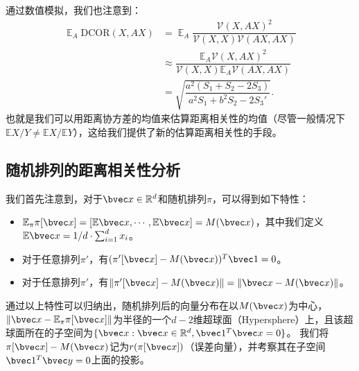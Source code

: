通过数值模拟，我们也注意到：
\begin{equation}
\label{eq:ss-perm:linear-dcor-estimation}
\begin{split}
    \mathop{\mathbb E}_A \text{DCOR}(X, AX) & = \mathop{\mathbb E}_A \dfrac{\mathcal{V}(X, AX)^2}{\mathcal{V}(X, X)\mathcal{V}(AX, AX)}
    \\
    &\approx \dfrac{\mathbb E_A \mathcal{V}(X, AX)^2}{\mathcal{V}(X, X) \mathbb E_A \mathcal{V}(AX, AX)}
    \\
    &= \sqrt{\dfrac{a^2(S_1 + S_2 - 2S_3)}{a^2S_1 + b^2S_2 - 2S_3'}}.
\end{split}
\end{equation}
%
也就是我们可以用距离协方差的均值来估算距离相关性的均值（尽管一般情况下$\mathbb E X/Y \ne \mathbb E X/\mathbb E Y$），这给我们提供了新的估算距离相关性的手段。
%


\subsection{随机排列的距离相关性分析}
我们首先注意到，对于$\bvec x \in \mathbb R^d$和随机排列$\pi$，可以得到如下特性：
\begin{itemize}
    \item $\mathbb E_\pi \pi[\bvec x] = [\mathbb E\bvec x, \cdots, \mathbb E\bvec x] = M(\bvec x)$，其中我们定义$\mathbb E\bvec x = 1/d \cdot \sum_{i=1}^d x_i$。
    \item 对于任意排列$\pi'$，有$(\pi'[\bvec x] - M(\bvec x))^T \bvec 1 = 0$。
    \item 对于任意排列$\pi'$，有$\Vert \pi'[\bvec x] - M(\bvec x)\Vert = \Vert \bvec x - M(\bvec x)\Vert$。
\end{itemize}
%
通过以上特性可以归纳出，随机排列后的向量分布在以$M(\bvec x)$为中心，$\Vert \bvec x - \mathbb E_\pi \pi[\bvec x]\Vert$为半径的一个$d - 2$维超球面（Hypersphere）上，且该超球面所在的子空间为$\{\bvec x: \bvec x \in \mathbb R^d, \bvec 1^T\bvec x = 0\}$。
%
我们将$\pi[\bvec x] - M(\bvec x)$记为$r(\pi[\bvec x])$（误差向量），并考察其在子空间$\bvec 1^T \bvec y = 0$上面的投影。
%

